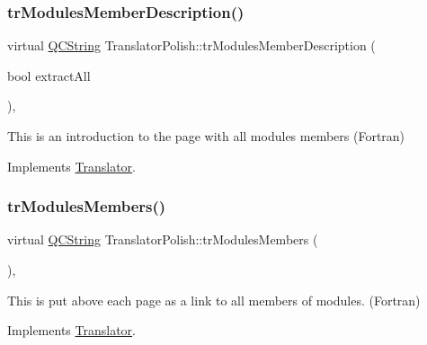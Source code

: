 \mbox{\label{class_translator_polish_af73d04434111580225dd1c66b9ea158b}} 
\subsubsection{\texorpdfstring{trModulesMemberDescription()}{trModulesMemberDescription()}}
{\footnotesize\ttfamily virtual \mbox{\hyperlink{class_q_c_string}{Q\+C\+String}} Translator\+Polish\+::tr\+Modules\+Member\+Description (\begin{DoxyParamCaption}\item[{bool}]{extract\+All }\end{DoxyParamCaption})\hspace{0.3cm}{\ttfamily [inline]}, {\ttfamily [virtual]}}

This is an introduction to the page with all modules members (Fortran) 

Implements \mbox{\hyperlink{class_translator}{Translator}}.

\mbox{\label{class_translator_polish_ae2ad3d07059f895fd9aa7f69c76ce72a}} 
\subsubsection{\texorpdfstring{trModulesMembers()}{trModulesMembers()}}
{\footnotesize\ttfamily virtual \mbox{\hyperlink{class_q_c_string}{Q\+C\+String}} Translator\+Polish\+::tr\+Modules\+Members (\begin{DoxyParamCaption}{ }\end{DoxyParamCaption})\hspace{0.3cm}{\ttfamily [inline]}, {\ttfamily [virtual]}}

This is put above each page as a link to all members of modules. (Fortran) 

Implements \mbox{\hyperlink{class_translator}{Translator}}.

\mbox{\label{class_translator_polish_ac5bf5b88079d6b285978bdfc679d7ddb}} 
